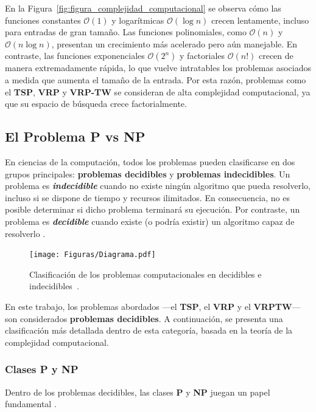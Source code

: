 \documentclass[12pt,titlepage,twoside,openright]{book}
\begin{document}
En la Figura~\ref{fig:figura_complejidad_computacional} se observa cómo las funciones constantes $\mathcal{O}(1)$ y logarítmicas $\mathcal{O}(\log n)$ crecen lentamente, incluso para entradas de gran tamaño. Las funciones polinomiales, como $\mathcal{O}(n)$ y $\mathcal{O}(n \log n)$, presentan un crecimiento más acelerado pero aún manejable. En contraste, las funciones exponenciales $\mathcal{O}(2^n)$ y factoriales $\mathcal{O}(n!)$ crecen de manera extremadamente rápida, lo que vuelve intratables los problemas asociados a medida que aumenta el tamaño de la entrada. Por esta razón, problemas como el \textbf{TSP}, \textbf{VRP} y \textbf{VRP-TW} se consideran de alta complejidad computacional, ya que su espacio de búsqueda crece factorialmente.
\subsection{El Problema P vs NP}

En ciencias de la computación, todos los problemas pueden clasificarse en dos grupos principales: \textbf{problemas decidibles} y \textbf{problemas indecidibles}. Un problema es \textbf{\emph{indecidible}} cuando no existe ningún algoritmo que pueda resolverlo, incluso si se dispone de tiempo y recursos ilimitados. En consecuencia, no es posible determinar si dicho problema terminará su ejecución. Por contraste, un problema es \textbf{\emph{decidible}} cuando existe (o podría existir) un algoritmo capaz de resolverlo \citep{maldonado2013problema}.

\begin{figure}[H]
	\centering
	\texttt{[image: Figuras/Diagrama.pdf]}
	\caption{Clasificación de los problemas computacionales en decidibles e indecidibles~\citep{maldonado2013problema}.}
	\label{fig:decidibilidad}
\end{figure}

En este trabajo, los problemas abordados —el \textbf{TSP}, el \textbf{VRP} y el \textbf{VRPTW}— son considerados \textbf{problemas decidibles}. A continuación, se presenta una clasificación más detallada dentro de esta categoría, basada en la teoría de la complejidad computacional.


\subsubsection{Clases P y NP}

Dentro de los problemas decidibles, las clases \textbf{P} y \textbf{NP} juegan un papel fundamental \citep{maldonado2013problema}.
\end{document}
